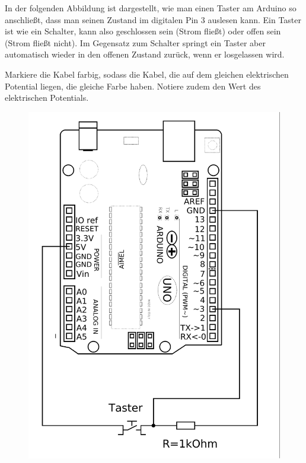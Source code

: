 \documentclass[ngerman, 11pt]{scrreprt}
\begin{document}
	In der folgenden Abbildung ist dargestellt, wie man einen Taster am Arduino so anschließt, dass man seinen Zustand im digitalen Pin 3 auslesen kann. Ein Taster ist wie ein Schalter, kann also geschlossen sein (Strom fließt) oder offen sein (Strom fließt nicht). Im Gegensatz zum Schalter springt ein Taster aber automatisch wieder in den offenen Zustand zurück, wenn er losgelassen wird.
	
	\begin{aufgabe*}
		Markiere die Kabel farbig, sodass die Kabel, die auf dem gleichen elektrischen Potential liegen, die gleiche Farbe haben. Notiere zudem den Wert des elektrischen Potentials.
	\end{aufgabe*}
	
	\begin{figure}[H]
		\hfill
		\begin{minipage}{0.4\textwidth}
			\includegraphics[width=\textwidth]{../Zeichnungen/taster-an-arduino.png}

\end{minipage}
\end{figure}
\end{document}
